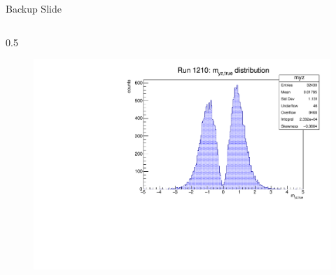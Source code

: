 \documentclass{beamer}[10pt]
\begin{document}
  \begin{frame}{Backup Slide}
    \vspace{-3mm}

    \begin{columns}
      \begin{column}{0.5\framewidth}
    \begin{figure}[H]
      \centering
      \includegraphics[width= \textwidth]{figures/pdf/myz.pdf}
      \label{fig:enter-label}
  \end{figure}
  \vspace{-12mm}


\end{column}
\end{columns}
\end{frame}
\end{document}

